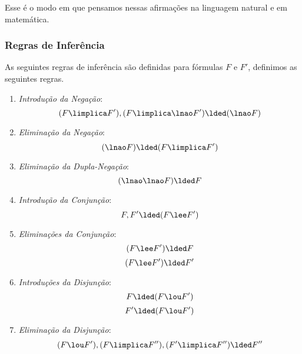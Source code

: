 Esse é o modo em que pensamos nessas afirmações na linguagem natural e em matemática.

\subsubsection{Regras de Inferência}

As seguintes regras de inferência são definidas para fórmulas $F$ e $F'$, definimos as seguintes regras.

\begin{enumerate}
\item \emph{Introdução da Negação}:
	\begin{equation*}
	(F \limplica F'), (F \limplica \lnao F') \lded (\lnao F)
	\end{equation*}

\item \emph{Eliminação da Negação}:
	\begin{equation*}
	(\lnao F) \lded (F \limplica F')
	\end{equation*}

\item \emph{Eliminação da Dupla-Negação}:
	\begin{equation*}
	(\lnao\lnao F) \lded F
	\end{equation*}

\item \emph{Introdução da Conjunção}:
	\begin{equation*}
	F, F' \lded (F \lee F')
	\end{equation*}

\item \emph{Eliminações da Conjunção}:
	\begin{equation*}
	(F \lee F') \lded F
	\end{equation*}
	\begin{equation*}
	(F \lee F') \lded F'
	\end{equation*}

\item \emph{Introduções da Disjunção}:
	\begin{equation*}
	F \lded (F \lou F')
	\end{equation*}
	\begin{equation*}
	F' \lded (F \lou F')
	\end{equation*}

\item \emph{Eliminação da Disjunção}:
	\begin{equation*}
	(F \lou F'), (F \limplica F''), (F' \limplica F'') \lded F''
	\end{equation*}


\end{enumerate}

